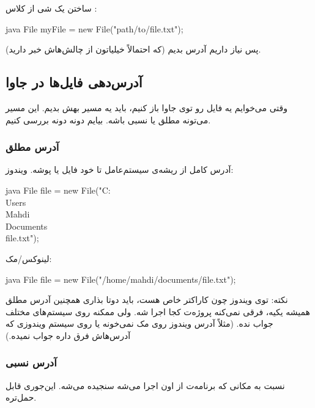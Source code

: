 ساختن یک شی از کلاس :

\begin{codebox}{java}
File myFile = new File("path/to/file.txt");
\end{codebox}

پس نیاز داریم آدرس بدیم (که احتمالاً خیلیاتون از چالش‌هاش خبر دارید).

\subsection{آدرس‌دهی فایل‌ها در جاوا }

وقتی می‌خوایم یه فایل رو توی جاوا باز کنیم، باید یه مسیر  بهش
بدیم. این مسیر می‌تونه مطلق  یا نسبی
 باشه. بیایم دونه دونه بررسی کنیم.

\subsubsection{آدرس مطلق }

آدرس کامل از ریشه‌ی سیستم‌عامل تا خود فایل یا پوشه. ویندوز:

\begin{codebox}{java}
File file = new File("C:\\Users\\Mahdi\\Documents\\file.txt");
\end{codebox}

لینوکس/مک:

\begin{codebox}{java}
File file = new File("/home/mahdi/documents/file.txt");
\end{codebox}

نکته: توی ویندوز چون \lr{\texttt{\textbackslash }} کاراکتر خاص
 هست، باید دوتا بذاری
\lr{\texttt{\textbackslash \textbackslash }} همچنین آدرس مطلق همیشه
یکیه، فرقی نمی‌کنه پروژه‌ت کجا اجرا شه. ولی ممکنه روی سیستم‌های مختلف جواب
نده. (مثلاً آدرس ویندوز روی مک نمی‌خونه یا روی سیستم ویندوزی که آدرس‌هاش
فرق داره جواب نمیده.)

\subsubsection{آدرس نسبی }

نسبت به مکانی که برنامه‌ت از اون اجرا می‌شه سنجیده می‌شه. این‌جوری قابل
حمل‌تره.

